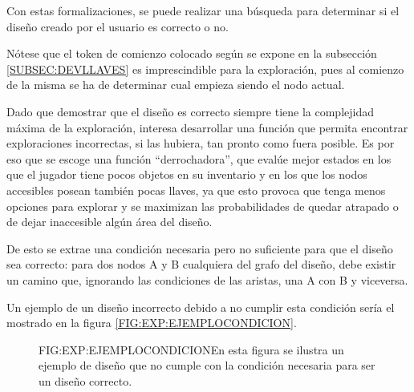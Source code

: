 Con estas formalizaciones, se puede realizar una búsqueda \cite{russell2016artificial}\cite{nilsson1998artificial} para determinar si el diseño creado por el usuario es correcto o no.

Nótese que el token de comienzo colocado según se expone en la subsección \ref{SUBSEC:DEVLLAVES} es imprescindible para la exploración, pues al comienzo de la misma se ha de determinar cual empieza siendo el nodo actual.

Dado que demostrar que el diseño es correcto siempre tiene la complejidad máxima de la exploración, interesa desarrollar una función  que permita encontrar exploraciones incorrectas, si las hubiera, tan pronto como fuera posible.
Es por eso que se escoge una función  ``derrochadora'', que evalúe mejor estados en los que el jugador tiene pocos objetos en su inventario y en los que los nodos accesibles posean también pocas llaves, ya que esto provoca que tenga menos opciones para explorar y se maximizan las probabilidades de quedar atrapado o de dejar inaccesible algún área del diseño.

De esto se extrae una condición necesaria pero no suficiente para que el diseño sea correcto:
para dos nodos A y B cualquiera del grafo del diseño, debe existir un camino que, ignorando las condiciones de las aristas, una A con B y viceversa.\newline

Un ejemplo de un diseño incorrecto debido a no cumplir esta condición sería el mostrado en la figura \ref{FIG:EXP:EJEMPLOCONDICION}.

\begin{figure}{FIG:EXP:EJEMPLOCONDICION}{En esta figura se ilustra un ejemplo de diseño que no cumple con la condición necesaria para ser un diseño correcto.}
	 \quad
\end{figure}

